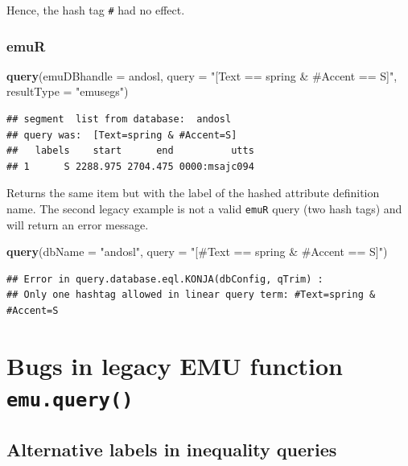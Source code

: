 \documentclass[]{book}
\newenvironment{Shaded}{\begin{snugshade}}{\end{snugshade}}
\newcommand{\DataTypeTok}[1]{\textcolor[rgb]{0.13,0.29,0.53}{#1}}
\newcommand{\KeywordTok}[1]{\textcolor[rgb]{0.13,0.29,0.53}{\textbf{#1}}}
\newcommand{\NormalTok}[1]{#1}
\newcommand{\StringTok}[1]{\textcolor[rgb]{0.31,0.60,0.02}{#1}}
\begin{document}
Hence, the hash tag \texttt{\#} had no effect.

\hypertarget{emur}{%
\subsubsection{emuR}\label{emur}}

\begin{Shaded}
\begin{Highlighting}[]
\KeywordTok{query}\NormalTok{(}\DataTypeTok{emuDBhandle =}\NormalTok{ andosl,}
      \DataTypeTok{query =} \StringTok{"[Text == spring & #Accent == S]"}\NormalTok{,}
      \DataTypeTok{resultType =} \StringTok{"emusegs"}\NormalTok{)}
\end{Highlighting}
\end{Shaded}

\begin{verbatim}
## segment  list from database:  andosl
## query was:  [Text=spring & #Accent=S]
##   labels    start      end          utts
## 1      S 2288.975 2704.475 0000:msajc094
\end{verbatim}

Returns the same item but with the label of the hashed
attribute definition name. The second legacy example is not a valid
\texttt{emuR} query (two hash tags) and will return an error message.

\begin{Shaded}
\begin{Highlighting}[]
\KeywordTok{query}\NormalTok{(}\DataTypeTok{dbName =} \StringTok{"andosl"}\NormalTok{,}
      \DataTypeTok{query =} \StringTok{"[#Text == spring & #Accent == S]"}\NormalTok{)}
\end{Highlighting}
\end{Shaded}

\begin{verbatim}
## Error in query.database.eql.KONJA(dbConfig, qTrim) :
## Only one hashtag allowed in linear query term: #Text=spring & #Accent=S
\end{verbatim}

\hypertarget{bugs-in-legacy-emu-function-emu.query}{%
\section{\texorpdfstring{Bugs in legacy EMU function \texttt{emu.query()}}{Bugs in legacy EMU function emu.query()}}\label{bugs-in-legacy-emu-function-emu.query}}

\hypertarget{alternative-labels-in-inequality-queries}{%
\subsection{Alternative labels in inequality queries}\label{alternative-labels-in-inequality-queries}}
\end{document}

